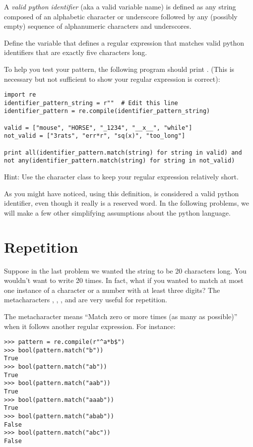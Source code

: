 \begin{problem}
A \emph{valid python identifier} (aka a valid variable name) is defined as any string composed of an alphabetic character or underscore followed by any (possibly empty) sequence of alphanumeric characters and underscores.

Define the variable  that defines a regular expression that matches valid python identifiers that are exactly five characters long. 

To help you test your pattern, the following program should print \mbox{.} (This is necessary but not sufficient to show your regular expression is correct):
\begin{lstlisting}
import re
identifier_pattern_string = r""  # Edit this line
identifier_pattern = re.compile(identifier_pattern_string)

valid = ["mouse", "HORSE", "_1234", "__x__", "while"]
not_valid = ["3rats", "err*r", "sq(x)", "too_long"]

print all(identifier_pattern.match(string) for string in valid) and not any(identifier_pattern.match(string) for string in not_valid)
\end{lstlisting}

Hint: Use the  character class to keep your regular expression relatively short.
\begin{info}
As you might have noticed, using this definition,  is considered a valid python identifier, even though it really is a reserved word. In the following problems, we will make a few other simplifying assumptions about the python language.
\end{info}
\end{problem}

\section*{Repetition}
Suppose in the last problem we wanted the string to be 20 characters long.
You wouldn't want to write \li{\\w} 20 times.
In fact, what if you wanted to match at most one instance of a character or a number with at least three digits?
The metacharacters , , , and  are very useful for repetition.

The  metacharacter means ``Match zero or more times (as many as possible)'' when it follows another regular expression.
For instance:
\begin{lstlisting}
>>> pattern = re.compile(r"^a*b$")
>>> bool(pattern.match("b"))
True
>>> bool(pattern.match("ab"))
True
>>> bool(pattern.match("aab"))
True
>>> bool(pattern.match("aaab"))
True
>>> bool(pattern.match("abab"))
False
>>> bool(pattern.match("abc"))
False
\end{lstlisting}

